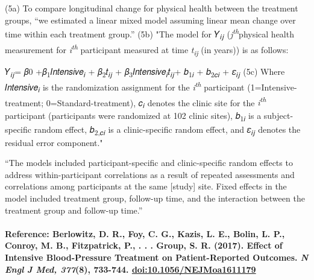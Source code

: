 \documentclass[
  openany]{book}
\begin{document}
(5a) To compare longitudinal change for physical health between the treatment groups, ``we estimated a linear mixed model assuming linear mean change over time within each treatment group.'' (5b) "The model for 𝑌\textsubscript{𝑖𝑗} (\emph{j\textsuperscript{th}}physical health measurement for \emph{i\textsuperscript{th}} participant measured at time \emph{t\textsubscript{ij}} (in years)) is as follows:

𝑌\textsubscript{𝑖𝑗}= 𝛽0 +𝛽\textsubscript{1}𝐼𝑛𝑡𝑒𝑛𝑠𝑖𝑣𝑒\textsubscript{𝑖} + 𝛽\textsubscript{2}𝑡\textsubscript{𝑖𝑗} + 𝛽\textsubscript{3}𝐼𝑛𝑡𝑒𝑛𝑠𝑖𝑣𝑒\textsubscript{𝑖}𝑡\textsubscript{𝑖𝑗}+ 𝑏\textsubscript{1𝑖} + 𝑏\textsubscript{2𝑐𝑖} + 𝜀\textsubscript{𝑖𝑗} (5c) Where 𝐼𝑛𝑡𝑒𝑛𝑠𝑖𝑣𝑒\textsubscript{𝑖} is the randomization assignment for the \emph{i\textsuperscript{th}} participant (1=Intensive-treatment; 0=Standard-treatment), 𝑐\textsubscript{𝑖} denotes the clinic site for the \emph{i\textsuperscript{th}} participant (participants were randomized at 102 clinic sites), 𝑏\textsubscript{1𝑖} is a subject-specific random effect, 𝑏\textsubscript{2,𝑐𝑖} is a clinic-specific random effect, and 𝜀\textsubscript{𝑖𝑗} denotes the residual error component."

``The models included participant-specific and clinic-specific random effects to address within-participant correlations as a result of repeated assessments and correlations among participants at the same {[}study{]} site. Fixed effects in the model included treatment group, follow-up time, and the interaction between the treatment group and follow-up time.''

\hypertarget{reference-berlowitz-d.-r.-foy-c.-g.-kazis-l.-e.-bolin-l.-p.-conroy-m.-b.-fitzpatrick-p.-.-.-.-group-s.-r.-2017.-effect-of-intensive-blood-pressure-treatment-on-patient-reported-outcomes.-n-engl-j-med-3778-733-744.-doi10.1056nejmoa1611179}{%
\paragraph{\texorpdfstring{Reference: Berlowitz, D. R., Foy, C. G., Kazis, L. E., Bolin, L. P., Conroy, M. B., Fitzpatrick, P., . . . Group, S. R. (2017). Effect of Intensive Blood-Pressure Treatment on Patient-Reported Outcomes. \emph{N Engl J Med, 377}(8), 733-744. \url{doi:10.1056/NEJMoa1611179}}{Reference: Berlowitz, D. R., Foy, C. G., Kazis, L. E., Bolin, L. P., Conroy, M. B., Fitzpatrick, P., . . . Group, S. R. (2017). Effect of Intensive Blood-Pressure Treatment on Patient-Reported Outcomes. N Engl J Med, 377(8), 733-744. doi:10.1056/NEJMoa1611179}}\label{reference-berlowitz-d.-r.-foy-c.-g.-kazis-l.-e.-bolin-l.-p.-conroy-m.-b.-fitzpatrick-p.-.-.-.-group-s.-r.-2017.-effect-of-intensive-blood-pressure-treatment-on-patient-reported-outcomes.-n-engl-j-med-3778-733-744.-doi10.1056nejmoa1611179}}
\end{document}
